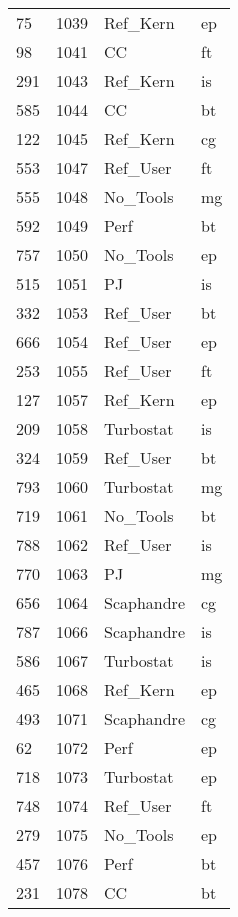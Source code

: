 \begin{tabular}{lrll}
75 & 1039 & Ref_Kern & ep \\
98 & 1041 & CC & ft \\
291 & 1043 & Ref_Kern & is \\
585 & 1044 & CC & bt \\
122 & 1045 & Ref_Kern & cg \\
553 & 1047 & Ref_User & ft \\
555 & 1048 & No_Tools & mg \\
592 & 1049 & Perf & bt \\
757 & 1050 & No_Tools & ep \\
515 & 1051 & PJ & is \\
332 & 1053 & Ref_User & bt \\
666 & 1054 & Ref_User & ep \\
253 & 1055 & Ref_User & ft \\
127 & 1057 & Ref_Kern & ep \\
209 & 1058 & Turbostat & is \\
324 & 1059 & Ref_User & bt \\
793 & 1060 & Turbostat & mg \\
719 & 1061 & No_Tools & bt \\
788 & 1062 & Ref_User & is \\
770 & 1063 & PJ & mg \\
656 & 1064 & Scaphandre & cg \\
787 & 1066 & Scaphandre & is \\
586 & 1067 & Turbostat & is \\
465 & 1068 & Ref_Kern & ep \\
493 & 1071 & Scaphandre & cg \\
62 & 1072 & Perf & ep \\
718 & 1073 & Turbostat & ep \\
748 & 1074 & Ref_User & ft \\
279 & 1075 & No_Tools & ep \\
457 & 1076 & Perf & bt \\
231 & 1078 & CC & bt \\
\bottomrule
\end{tabular}
